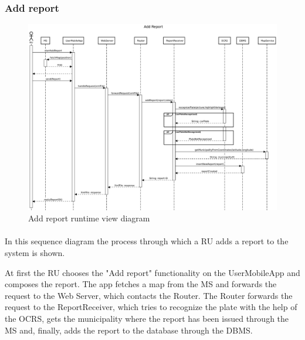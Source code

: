				\subsubsection{Add report}
					\begin{figure}[!h]
						\centering
						\includegraphics[width=\textwidth]{images/DD2/RuntimeView/RU/AddReport.pdf}
						\caption{Add report runtime view diagram}
					\end{figure}
					\paragraph{}
						In this sequence diagram the process through which a RU adds a report to the system is shown. 
						
						At first the RU chooses the "Add report" functionality on the UserMobileApp and composes the report. The app fetches a map from the MS and forwards the request to the Web Server, which contacts the Router. The Router forwards the request to the ReportReceiver, which tries to recognize the plate with the help of the OCRS, gets the municipality where the report has been issued through the MS and, finally, adds the report to the database through the DBMS.

